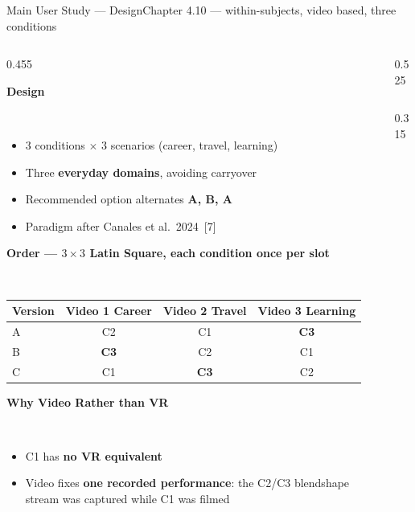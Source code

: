 \documentclass[aspectratio=169,10pt]{beamer}
\newcommand{\hl}[1]{{\color{knblue}\textbf{#1}}}
\newcommand{\bad}[1]{{\color{knred}\textbf{#1}}}
\newcommand{\panelhead}[1]{\noindent\colorbox{kncyan}{\parbox{0.96\textwidth}{\centering\vspace{1pt}\color{white}\scriptsize\bfseries #1\vspace{1pt}}}\\[0.25em]}
\newcommand{\panelheadsm}[1]{\noindent\colorbox{kncyan}{\parbox{0.96\textwidth}{\centering\vspace{1pt}\color{white}\tiny\bfseries #1\vspace{1pt}}}\\[0.2em]}
\newcommand{\panel}[1]{\noindent\colorbox{knlight}{\parbox{0.96\textwidth}{\vspace{2pt}\scriptsize
\begin{itemize}\setlength{\itemsep}{0.2em}\setlength{\leftmargini}{1.1em}#1\end{itemize}\vspace{2pt}}}}
\begin{document}
\begin{frame}{Main User Study — Design}{Chapter 4.10 — within-subjects, video based, three conditions}
  \vspace{-0.4em}
  \begin{columns}[T]
    \begin{column}{0.455\textwidth}
      \panelhead{Design}
      \panel{%
        \item 3 conditions $\times$ 3 scenarios (career, travel, learning)
        \item Three \hl{everyday domains}, avoiding carryover
        \item Recommended option alternates \hl{A, B, A}
        \item Paradigm after Canales et al.\ 2024~[7]}
      \vspace{0.1em}
      \panelheadsm{Order — $3\times3$ Latin Square, each condition once per slot}
      {\centering\tiny
      \setlength{\tabcolsep}{3pt}\renewcommand{\arraystretch}{1.12}
      \begin{tabular}{@{}lccc@{}}
        \toprule
        \textbf{Version} & \textbf{Video 1 Career} & \textbf{Video 2 Travel} & \textbf{Video 3 Learning} \\
        \midrule
        A & C2 & C1 & \hl{C3} \\
        B & \hl{C3} & C2 & C1 \\
        C & C1 & \hl{C3} & C2 \\
        \bottomrule
      \end{tabular}\par}
      \vspace{0.1em}
      \panelheadsm{Why Video Rather than VR}
      \noindent\colorbox{knlight}{\parbox{0.96\textwidth}{\vspace{2pt}\tiny
      \begin{itemize}\setlength{\itemsep}{0.15em}\setlength{\leftmargini}{0.9em}\setlength{\topsep}{0pt}\setlength{\parskip}{0pt}
        \item C1 has \bad{no VR equivalent}
        \item Video fixes \hl{one recorded performance}: the C2/C3 blendshape stream was captured while C1 was filmed
      \end{itemize}\vspace{2pt}}}
    \end{column}
    \begin{column}{0.525\textwidth}
      \begin{columns}[T]
        \begin{column}{0.315\textwidth}\centering

\end{column}
\end{columns}
\end{column}
\end{columns}
\end{frame}
\end{document}

